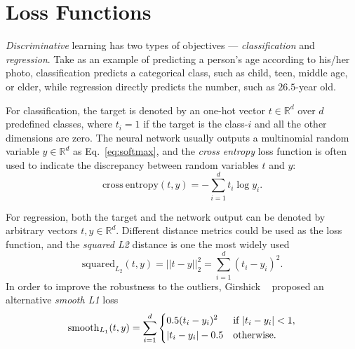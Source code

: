 \section{Loss Functions} %
\label{sec:dl-loss}
\emph{Discriminative} learning has two types of objectives --- \emph{classification} and \emph{regression}. Take as an example of predicting a person's age according to his/her photo, classification predicts a categorical class, such as child, teen, middle age, or elder, while regression directly predicts the number, such as $26.5$-year old.

For classification, the target is denoted by an one-hot vector $t\in\mathbb{R}^d$ over $d$ predefined classes, where $t_i=1$ if the target is the class-$i$ and all the other dimensions are zero. The neural network usually outputs a multinomial random variable $y\in\mathbb{R}^d$ as Eq.~\eqref{eq:softmax}, and the \emph{cross entropy} loss function is often used to indicate the discrepancy between random variables $t$ and $y$:
\begin{equation}
  \mathrm{cross\ entropy}(t, y) = -\sum_{i=1}^d t_i \log y_i.
\end{equation}

For regression, both the target and the network output can be denoted by arbitrary vectors $t, y\in\mathbb{R}^d$. Different distance metrics could be used as the loss function, and the \emph{squared L2} distance is one the most widely used
\begin{equation}
  \mathrm{squared}_{L_2}(t, y) = ||t-y||_2^2 = \sum_{i=1}^d (t_i - y_i)^2.
\end{equation}
In order to improve the robustness to the outliers, Girshick \etal~\cite{girshick2015fast} proposed an alternative \emph{smooth L1} loss
\begin{equation}
  \mathrm{smooth}_{L_1}(t, y) = \sum_{i=1}^d \begin{dcases}
    0.5(t_i - y_i)^2 & \text{if }|t_i-y_i| < 1,\\
    |t_i-y_i| - 0.5  & \text{otherwise}.
  \end{dcases}
\end{equation}


